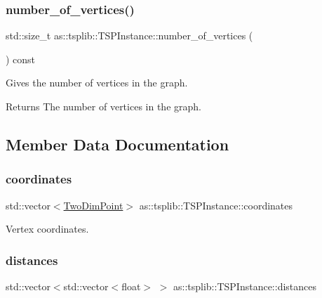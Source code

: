 \subsubsection{\texorpdfstring{number\+\_\+of\+\_\+vertices()}{number\_of\_vertices()}}
{\footnotesize\ttfamily std\+::size\+\_\+t as\+::tsplib\+::\+T\+S\+P\+Instance\+::number\+\_\+of\+\_\+vertices (\begin{DoxyParamCaption}{ }\end{DoxyParamCaption}) const\hspace{0.3cm}{\ttfamily [inline]}}



Gives the number of vertices in the graph. 

\begin{DoxyReturn}{Returns}
The number of vertices in the graph. 
\end{DoxyReturn}


\subsection{Member Data Documentation}
\mbox{\label{classas_1_1tsplib_1_1TSPInstance_ad8e74403f222f9470bf320e5749e6d9a}} 
\subsubsection{\texorpdfstring{coordinates}{coordinates}}
{\footnotesize\ttfamily std\+::vector$<$\hyperlink{structas_1_1TwoDimPoint}{Two\+Dim\+Point}$>$ as\+::tsplib\+::\+T\+S\+P\+Instance\+::coordinates\hspace{0.3cm}{\ttfamily [protected]}}



Vertex coordinates. 

\mbox{\label{classas_1_1tsplib_1_1TSPInstance_a51073058c9b3f316da6b2115a9c8bec1}} 
\subsubsection{\texorpdfstring{distances}{distances}}
{\footnotesize\ttfamily std\+::vector$<$std\+::vector$<$float$>$ $>$ as\+::tsplib\+::\+T\+S\+P\+Instance\+::distances\hspace{0.3cm}{\ttfamily [protected]}}



